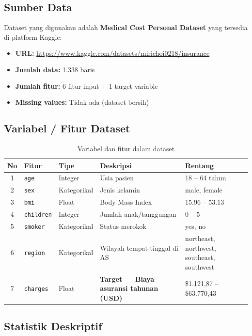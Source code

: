 \documentclass[12pt,a4paper]{article}
\begin{document}
\subsection{Sumber Data}

Dataset yang digunakan adalah \textbf{Medical Cost Personal Dataset} yang tersedia di platform Kaggle:
\begin{itemize}
    \item \textbf{URL:} \url{https://www.kaggle.com/datasets/mirichoi0218/insurance}
    \item \textbf{Jumlah data:} 1.338 baris
    \item \textbf{Jumlah fitur:} 6 fitur input + 1 target variable
    \item \textbf{Missing values:} Tidak ada (dataset bersih)
\end{itemize}

\subsection{Variabel / Fitur Dataset}

\begin{table}[h!]
\centering
\caption{Variabel dan fitur dalam dataset}
\begin{tabular}{clllp{4cm}}
\toprule
\textbf{No} & \textbf{Fitur} & \textbf{Tipe} & \textbf{Deskripsi} & \textbf{Rentang} \\
\midrule
1 & \texttt{age}      & Integer     & Usia pasien                     & 18 – 64 tahun \\
2 & \texttt{sex}      & Kategorikal & Jenis kelamin                   & male, female \\
3 & \texttt{bmi}      & Float       & Body Mass Index                 & 15.96 – 53.13 \\
4 & \texttt{children} & Integer     & Jumlah anak/tanggungan          & 0 – 5 \\
5 & \texttt{smoker}   & Kategorikal & Status merokok                  & yes, no \\
6 & \texttt{region}   & Kategorikal & Wilayah tempat tinggal di AS    & northeast, northwest, southeast, southwest \\
7 & \texttt{charges}  & Float       & \textbf{Target — Biaya asuransi tahunan (USD)} & \$1.121,87 – \$63.770,43 \\
\bottomrule
\end{tabular}
\end{table}

\subsection{Statistik Deskriptif}
\end{document}
